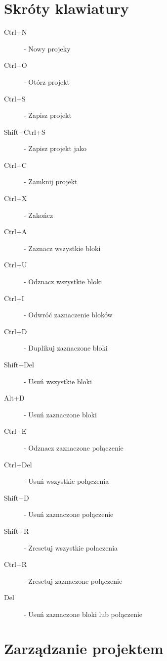 \documentclass[a4paper,10pt]{article}
\begin{document}
\section{Skróty klawiatury}
\begin{description}
 \item[Ctrl+N] - Nowy projeky
 \item[Ctrl+O] - Otórz projekt
 \item[Ctrl+S] - Zapisz projekt
 \item[Shift+Ctrl+S] - Zapisz projekt jako
 \item[Ctrl+C] - Zamknij projekt
 \item[Ctrl+X] - Zakończ
 \item[Ctrl+A] - Zaznacz wszystkie bloki
 \item[Ctrl+U] - Odznacz wszystkie bloki
 \item[Ctrl+I] - Odwróć zaznaczenie bloków
 \item[Ctrl+D] - Duplikuj zaznaczone bloki
 \item[Shift+Del] - Usuń wszystkie bloki
 \item[Alt+D] - Usuń zaznaczone bloki
 \item[Ctrl+E] - Odznacz zaznaczone połączenie
 \item[Ctrl+Del] - Usuń wszystkie połączenia
 \item[Shift+D] - Usuń zaznaczone połączenie
 \item[Shift+R] - Zresetuj wszystkie połaczenia
 \item[Ctrl+R] - Zresetuj zaznaczone połączenie
 \item[Del] - Usuń zaznaczone bloki lub połączenie
 \end{description}
\section{Zarządzanie projektem}
\end{document}
